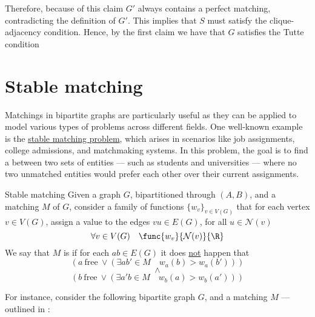 \documentclass[a4paper, 12pt]{report}
\begin{document}
{        Therefore, because of this claim $G'$ always contains a perfect matching, contradicting the definition of $G'$. This implies that $S$ must satisfy the clique-adjacency condition. Hence, by the first claim we have that $G$ satisfies the Tutte condition 
    }

    \section{Stable matching}

    Matchings in bipartite graphs are particularly useful as they can be applied to model various types of problems across different fields. One well-known example is the \href{https://en.wikipedia.org/wiki/Stable_marriage_problem}{stable matching problem}, which arises in scenarios like job assignments, college admissions, and matchmaking systems. In this problem, the goal is to find a  between two sets of entities --- such as students and universities --- where no two unmatched entities would prefer each other over their current assignments.

    \begin{frameddefn}{Stable matching}
        Given a graph $G$, bipartitioned through $(A, B)$, and a matching $M$ of $G$, consider a family of  functions $\{w_v\}_{v \in V(G)}$ that for each vertex $v \in V(G)$, assign a value to the edges $vu \in E(G)$, for all $u \in \mathcal N (v)$ $$\forall v \in V(G) \quad \func{w_v}{\mathcal N (v)}{\R}$$ We say that $M$ is  if for each $ab \in E(G)$ it does \underline{not} happen that $$(a \ \mathrm{free} \ \lor (\exists ab' \in M \quad w_a(b) > w_a(b')))$$ $$\land$$ $$(b \ \mathrm{free} \ \lor (\exists a'b \in M \quad w_b(a) > w_b(a')))$$
    \end{frameddefn}

    For instance, consider the following bipartite graph $G$, and a matching $M$ --- outlined in :

    \begin{figure}[H]
        \centering
    \end{figure}
\end{document}
